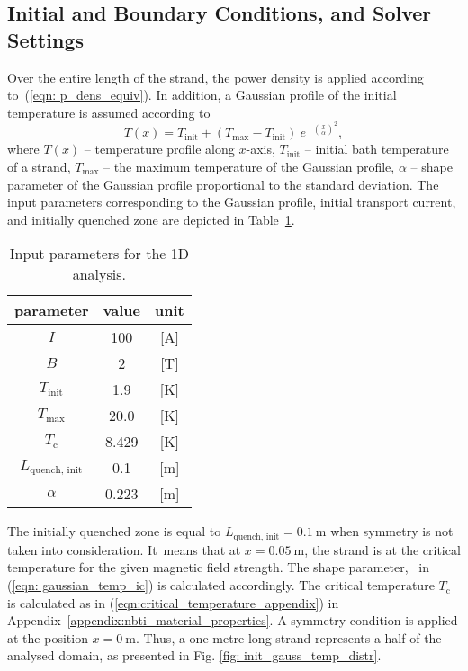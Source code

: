 \subsection{Initial and Boundary Conditions, and Solver Settings}

Over the entire length of the strand, the power density is applied according to~(\ref{eqn: p_dens_equiv}). In addition, a Gaussian profile of the initial temperature is assumed according to 
\begin{equation}
    T(x) = T_\text{init} + (T_\text{max} - T_\text{init}) ~ e^{-(\frac{x}{\alpha})^2},
    \label{eqn: gaussian_temp_ic}
\end{equation}
where $T(x)$ -- temperature profile along $x$-axis, $T_\text{init}$ -- initial bath temperature of a strand, $T_\text{max}$ -- the maximum temperature of the Gaussian profile, $\alpha$ -- shape parameter of the Gaussian profile proportional to the standard deviation. The input parameters corresponding to the Gaussian profile, initial transport current, and initially quenched zone are depicted in Table~\ref{table: 1d_quench_propagation_analysis_init_temp_input_parameters}. 

\begin{table}[H]
    \caption{Input parameters for the 1D analysis.} 
    \vspace{-1.em} 
    \fontsize{10}{10}
    \selectfont 
    \renewcommand{\arraystretch}{1.5}
    \begin{center}
        \begin{tabular}{ ccc }  
        \hline
        parameter & value & unit \\
        \hline
        $I$ & 100 & [A] \\
        $B$ & 2 & [T] \\
        $T_\text{init}$ & 1.9 & [K] \\
        $T_\text{max}$ & 20.0 & [K] \\
        $T_\text{c}$ & 8.429 & [K] \\
        $L_\text{quench, init}$ & 0.1 & [m] \\ 
        $\alpha$ & 0.223 & [m] \\   
        \hline 
        \end{tabular}
    \end{center}  
     \label{table: 1d_quench_propagation_analysis_init_temp_input_parameters} 
 \end{table}

The initially quenched zone is equal to $L_\text{quench, init}= 0.1~\text{m}$ when symmetry is not taken into consideration. It~means that at $x=0.05~\text{m}$, the strand is at the critical temperature for the given magnetic field strength. The shape parameter, \textalpha~in (\ref{eqn: gaussian_temp_ic}) is calculated accordingly. The critical temperature $T_\text{c}$ is calculated as in (\ref{eqn:critical_temperature_appendix}) in Appendix~\ref{appendix:nbti_material_properties}. A symmetry condition is applied at the position $x=0~\text{m}$. Thus, a one metre-long strand represents a half of the analysed domain, as presented in Fig. \ref{fig: init_gauss_temp_distr}.

